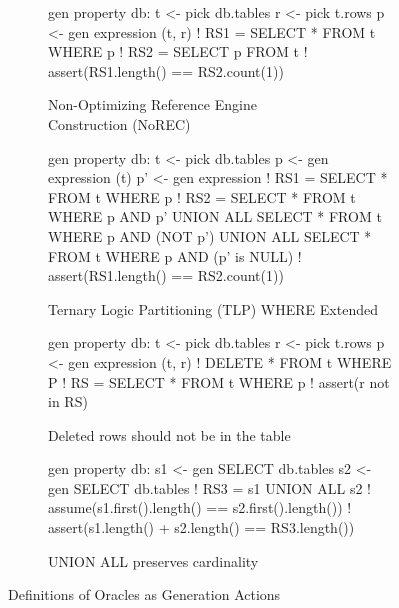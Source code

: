 \begin{figure}
  \centering
  \begin{subfigure}{0.90\textwidth}
    \begin{gacode}
gen property db:
    t <- pick db.tables
    r <- pick t.rows
    p <- gen expression (t, r)
    ! RS1 = SELECT * FROM t WHERE p
    ! RS2 = SELECT p FROM t
    ! assert(RS1.length() == RS2.count(1))
\end{gacode}
    \caption{Non-Optimizing Reference Engine\\Construction (NoREC)}
    \label{dirt:fig:norec}
  \end{subfigure}
  \begin{subfigure}{0.90\textwidth}
    \begin{gacode}
gen property db:
    t <- pick db.tables
    p <- gen expression (t)
    p' <- gen expression
    ! RS1 = SELECT * FROM t WHERE p
    ! RS2 = SELECT * FROM t WHERE p AND p' UNION ALL
    SELECT * FROM t WHERE p AND (NOT p') UNION ALL
    SELECT * FROM t WHERE p AND (p' is NULL)
    ! assert(RS1.length() == RS2.count(1))
\end{gacode}
    \caption{Ternary Logic Partitioning (TLP) WHERE Extended}
    \label{dirt:fig:tlp}
  \end{subfigure}
  \begin{subfigure}{0.90\textwidth}
    \begin{gacode}
gen property db:
    t <- pick db.tables
    r <- pick t.rows
    p <- gen expression (t, r)
    ! DELETE * FROM t WHERE P
    ! RS = SELECT * FROM t WHERE p
    ! assert(r not in RS)
\end{gacode}
    \caption{Deleted rows should not be in the table}
    \label{dirt:fig:deleted_rows}
  \end{subfigure}
  \begin{subfigure}{0.90\textwidth}
    \begin{gacode}
gen property db:
    s1 <- gen SELECT db.tables
    s2 <- gen SELECT db.tables
    ! RS3 = s1 UNION ALL s2
    ! assume(s1.first().length() == s2.first().length())
    ! assert(s1.length() + s2.length() == RS3.length())
\end{gacode}
    \caption{UNION ALL preserves cardinality}
    \label{dirt:fig:union_all}
  \end{subfigure}
  \caption{Definitions of Oracles as Generation Actions}
  \label{dirt:fig:gen-actions}
\end{figure}


